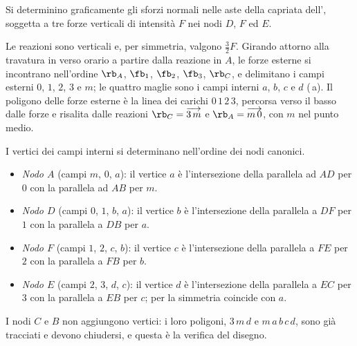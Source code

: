 \begin{esempio}
	\label{ese:cremoniano_sgr}
	Si determinino graficamente gli sforzi normali nelle aste della capriata
	dell', soggetta a tre forze verticali di intensità $F$ nei nodi
	$D$, $F$ ed $E$.
	
	\begin{svolgimento}
		Le reazioni sono verticali e, per simmetria, valgono $\tfrac{3}{2}F$. Girando attorno alla
		travatura in verso orario a partire dalla reazione in $A$, le forze esterne si incontrano
		nell'ordine $\rb_A$, $\fb_1$, $\fb_2$, $\fb_3$, $\rb_C$, e delimitano i campi esterni $0$, $1$,
		$2$, $3$ e $m$; le quattro maglie sono i campi interni $a$, $b$,
		$c$ e $d$ (\,a). Il poligono delle forze esterne
		è la linea dei carichi $0\,1\,2\,3$, percorsa verso il basso dalle forze e risalita dalle
		reazioni $\rb_C = \overrightarrow{3\,m}$ e $\rb_A = \overrightarrow{m\,0}$, con $m$ nel punto
		medio.
		
		I vertici dei campi interni si determinano nell'ordine dei nodi canonici.
		\begin{itemize}
			\item \emph{Nodo $A$} (campi $m$, $0$, $a$): il vertice $a$ è l'intersezione
			della parallela ad $AD$ per $0$ con la parallela ad $AB$ per $m$.
			\item \emph{Nodo $D$} (campi $0$, $1$, $b$, $a$): il vertice $b$ è
			l'intersezione della parallela a $DF$ per $1$ con la parallela a $DB$ per $a$.
			\item \emph{Nodo $F$} (campi $1$, $2$, $c$, $b$): il vertice
			$c$ è l'intersezione della parallela a $FE$ per $2$ con la parallela a $FB$ per
			$b$.
			\item \emph{Nodo $E$} (campi $2$, $3$, $d$, $c$): il vertice
			$d$ è l'intersezione della parallela a $EC$ per $3$ con la parallela a $EB$ per
			$c$; per la simmetria coincide con $a$.
		\end{itemize}
		I nodi $C$ e $B$ non aggiungono vertici: i loro poligoni, $3\,m\,d$ e
		$m\,a\,b\,c\,d$, sono già tracciati e devono
		chiudersi, e questa è la verifica del disegno.
		

\end{svolgimento}
\end{esempio}
